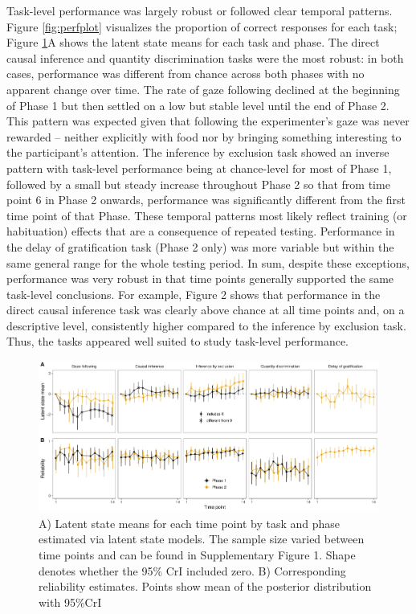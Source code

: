 \documentclass[
  man,floatsintext]{apa6}
\begin{document}
Task-level performance was largely robust or followed clear temporal patterns. Figure \ref{fig:perfplot} visualizes the proportion of correct responses for each task; Figure \ref{fig:lsmplot}A shows the latent state means for each task and phase. The direct causal inference and quantity discrimination tasks were the most robust: in both cases, performance was different from chance across both phases with no apparent change over time. The rate of gaze following declined at the beginning of Phase 1 but then settled on a low but stable level until the end of Phase 2. This pattern was expected given that following the experimenter's gaze was never rewarded -- neither explicitly with food nor by bringing something interesting to the participant's attention. The inference by exclusion task showed an inverse pattern with task-level performance being at chance-level for most of Phase 1, followed by a small but steady increase throughout Phase 2 so that from time point 6 in Phase 2 onwards, performance was significantly different from the first time point of that Phase. These temporal patterns most likely reflect training (or habituation) effects that are a consequence of repeated testing. Performance in the delay of gratification task (Phase 2 only) was more variable but within the same general range for the whole testing period. In sum, despite these exceptions, performance was very robust in that time points generally supported the same task-level conclusions. For example, Figure 2 shows that performance in the direct causal inference task was clearly above chance at all time points and, on a descriptive level, consistently higher compared to the inference by exclusion task. Thus, the tasks appeared well suited to study task-level performance.

\begin{figure}
\includegraphics[width=1\linewidth]{./figures/latent_states_reliability} \caption{A) Latent state means for each time point by task and phase estimated via latent state models. The sample size varied between time points and can be found in Supplementary Figure 1. Shape denotes whether the 95\% CrI included zero. B) Corresponding reliability estimates. Points show mean of the posterior distribution with 95\%CrI}\label{fig:lsmplot}
\end{figure}
\end{document}
